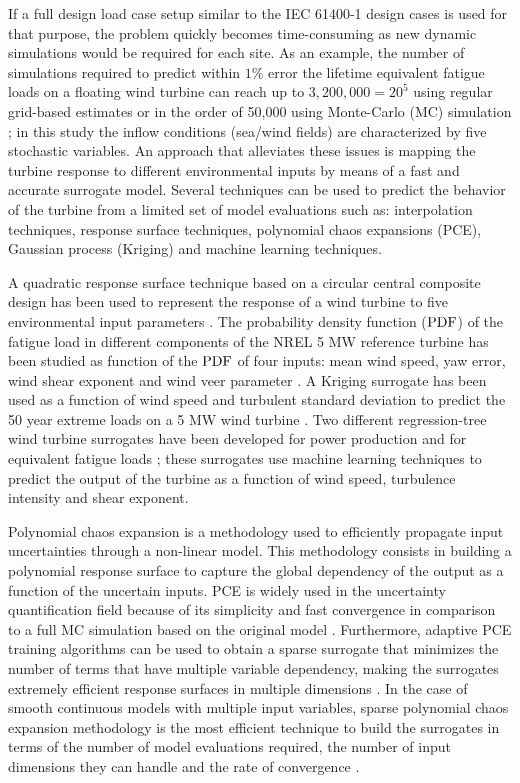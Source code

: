 \documentclass[preprint,12pt]{elsarticle}
\begin{document}
If a full design load case setup similar to the IEC 61400-1 design cases is used for that purpose, the problem quickly becomes time-consuming as new dynamic simulations would be required for each site. As an example, the number of simulations required to predict within $1\%$ error the lifetime equivalent fatigue loads on a floating wind turbine can reach up to $3,200,000=20^5$ using regular grid-based estimates or in the order of 50,000 using Monte-Carlo (MC) simulation \cite{graf2015high}; in this study the inflow conditions (sea/wind fields) are characterized by five stochastic variables. An approach that alleviates these issues is mapping the turbine response to different environmental inputs by means of a fast and accurate surrogate model. Several techniques can be used to predict the behavior of the turbine from a limited set of model evaluations such as: interpolation techniques, response surface techniques, polynomial chaos expansions (PCE), Gaussian process (Kriging) and machine learning techniques. 

A quadratic response surface technique based on a circular central composite design has been used to represent the response of a wind turbine to five environmental input parameters \cite{toft2016assessment}. The probability density function ($\mathrm{PDF}$) of the fatigue load in different components of the NREL 5 MW reference turbine has been studied as function of the $\mathrm{PDF}$ of four inputs: mean wind speed, yaw error, wind shear exponent and wind veer parameter \cite{TallwindReport}. A Kriging surrogate has been used as a function of wind speed and turbulent standard deviation to predict the 50 year extreme loads on a 5 MW wind turbine \cite{abdallah2016influence}. Two different regression-tree wind turbine surrogates have been developed for power production \cite{clifton2013using} and for equivalent fatigue loads \cite{clifton2014effect}; these surrogates use machine learning techniques to predict the output of the turbine as a function of wind speed, turbulence intensity and shear exponent.

Polynomial chaos expansion is a methodology used to efficiently propagate input uncertainties through a non-linear model. This methodology consists in building a polynomial response surface to capture the global dependency of the output as a function of the uncertain inputs. PCE is widely used in the uncertainty quantification field because of its simplicity and fast convergence in comparison to a full MC simulation based on the original model \cite{soize2004physical, le2004uncertainty, choi2004polynomial, berveiller2006stochastic, xiu2005high}. Furthermore, adaptive PCE training algorithms can be used to obtain a sparse surrogate that minimizes the number of terms that have multiple variable dependency, making the surrogates extremely efficient response surfaces in multiple dimensions  \cite{blatman2011adaptive,pedregosa2011scikit,tibshirani1996regression}. In the case of smooth continuous models with multiple input variables, sparse polynomial chaos expansion methodology is the most efficient technique to build the surrogates in terms of the number of model evaluations required, the number of input dimensions they can handle and the rate of convergence \cite{blatman2011adaptive}.
\end{document}
